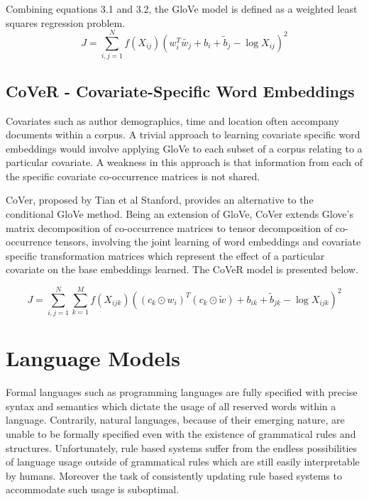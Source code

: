 \noindent
\newline
Combining equations 3.1 and 3.2, the GloVe model is defined as a weighted least squares regression problem.
\begin{equation}
	J = \sum_{i, j=1}^{N} f(X_{ij}) (w_{i}^{T} \tilde{w_{j}} + b_{i} + \tilde{b}_{j} - \log{X_{ij}})^{2}
\end{equation}
\subsection{CoVeR - Covariate-Specific Word Embeddings}
Covariates such as author demographics, time and location often accompany documents within a corpus. A trivial approach to learning covariate specific word embeddings would involve applying GloVe to each subset of a corpus relating to a particular covariate. A weakness in this approach is that information from each of the specific covariate co-occurrence matrices is not shared.

\noindent
\newline
CoVer, proposed by Tian et al Stanford, provides an alternative to the conditional GloVe method. Being an extension of GloVe, CoVer extends Glove's matrix decomposition of co-occurrence matrices to tensor decomposition of co-occurrence tensors, involving the joint learning of word embeddings and covariate specific transformation matrices which represent the effect of a particular covariate on the base embeddings learned. The CoVeR model is presented below.

\begin{equation}
J = \sum_{i, j=1}^{N} \sum_{k=1}^{M} f(X_{ijk}) ((c_{k} \odot w_{i})^{T} (c_{k} \odot \tilde{w}) + b_{ik} + \tilde{b}_{jk} - \log{X_{ijk}})^{2}
\end{equation}


\section{Language Models}
Formal languages such as programming languages are fully specified with precise syntax and semantics which dictate the usage of all reserved words within a language. Contrarily, natural languages, because of their emerging nature, are unable to be formally specified even with the existence of grammatical rules and structures. Unfortunately, rule based systems suffer from the endless possibilities of language usage outside of grammatical rules which are still easily interpretable by humans. Moreover the task of consistently updating rule based systems to accommodate such usage is suboptimal.  

